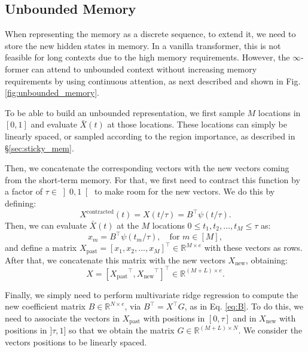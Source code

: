 \documentclass[11pt]{article}
\begin{document}
\subsection{Unbounded Memory}
\label{sec:unbounded_memory}

When representing the memory as a discrete sequence, to extend it, we need to store the new hidden states in memory. In a vanilla transformer, this is not feasible for long contexts due to the high memory requirements.
However, the $\infty$-former can attend to unbounded context without increasing memory requirements by using continuous attention, as next described and shown in Fig. \ref{fig:unbounded_memory}. 

To be able to build an unbounded representation, we first sample $M$ locations in $[0,1]$ and evaluate $\bar{X}(t)$ at those locations. These locations can simply be linearly spaced, or sampled according to the region importance, as described in \S\ref{sec:sticky_mem}.

Then, we concatenate the corresponding vectors with the new vectors coming from the short-term memory. 
For that, we first need to contract this function by a factor of $\tau \in  \left]0,1\right[$ to make room for the new vectors. We do this by defining: 
\begin{equation}
X^{\mathrm{contracted}}(t) = X(t/\tau) = B^\top \psi(t/\tau).
\end{equation}
Then, we can evaluate $\bar{X}(t)$ at the $M$ locations ${0 \le t_1, t_2, \ldots, t_M \le \tau}$ as:
\begin{equation}\label{eq:eval_signal_LTM}
x_m = B^\top \psi(t_m/\tau), \quad \text{for ${m \in [M]}$},
\end{equation}
and define a matrix  $X_\mathrm{past} = [x_1, x_2, \dots, x_M]^\top \in \mathbb{R}^{M \times e}$ with these vectors as rows. 
After that, we concatenate this matrix with the new vectors $X_\mathrm{new}$, obtaining:
\begin{equation}
    X = \left[{X_\mathrm{past}}^\top, {X_\mathrm{new}}^\top\right]^\top \in \mathbb{R}^{(M+L)\times e}.
\end{equation}

Finally, we simply need to 
perform multivariate ridge regression to compute the new coefficient matrix ${B \in \mathbb{R}^{N \times e}}$, via ${B^\top = X^\top G}$, as in Eq. \ref{eq:B}.
To do this, we need to associate the vectors in $X_\mathrm{past}$ with positions in $[0,\tau]$ and in $X_\mathrm{new}$ with positions in $]\tau,1]$ so that we obtain the matrix ${G \in \mathbb{R}^{(M+L)\times N}}$.
We consider the vectors positions to be linearly spaced.
\end{document}
